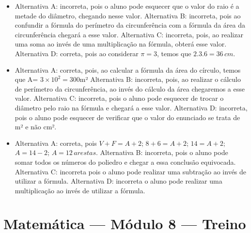\begin{itemize}
\item Alternativa A: incorreta, pois o aluno pode esquecer que o valor do raio
é a metade do diâmetro, chegando nesse valor.
Alternativa B: incorreta, pois ao confundir a fórmula do perímetro da
circunferência com a fórmula da área da circunferência chegará a esse
valor.
Alternativa C: incorreta, pois, ao realizar uma soma ao invés de uma
multiplicação na fórmula, obterá esse valor.
Alternativa D: correta, pois ao considerar $\pi = 3$, temos que $2.3.6 = 36\,cm$.

\item Alternativa A: correta, pois, ao calcular a fórmula da área do círculo,
temos que A= $3\times 10^2 = 300$m²
Alternativa B: incorreta, pois, ao realizar o cálculo de perímetro da
circunferência, ao invés do cálculo da área chegaremos a esse valor.
Alternativa C: incorreta, pois o aluno pode esquecer de trocar o
diâmetro pelo raio na fórmula e chegará a esse valor.
Alternativa D: incorreta, pois o aluno pode esquecer de verificar que o
valor do enunciado se trata de m² e não cm².

\item Alternativa A: correta, pois $V + F = A + 2$; $8 + 6 = A + 2$; $14 = A + 2$; $A = 14 - 2$; $A = 12\,arestas$.
Alternativa B: incorreta, pois o aluno pode somar todos os números do
poliedro e chegar a essa conclusão equivocada.
Alternativa C: incorreta pois o aluno pode realizar uma subtração ao
invés de utilizar a fórmula.
Alternativa D: incorreta o aluno pode realizar uma multiplicação ao
invés de utilizar a fórmula.
\end{itemize}

\section*{Matemática — Módulo 8 — Treino}

